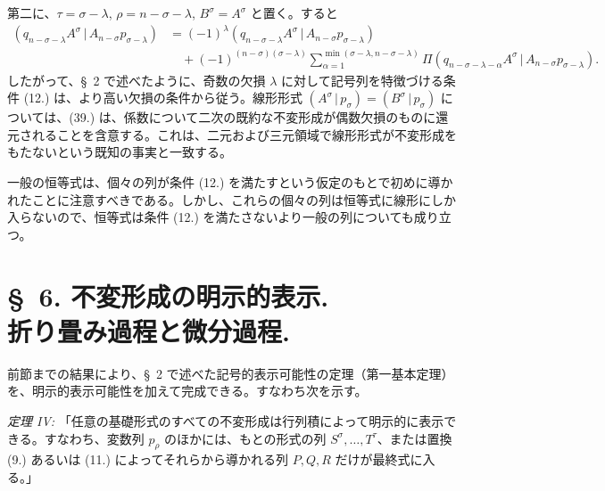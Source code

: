 \documentclass[11pt]{jlreq}
\newcommand{\pair}[2]{(#1\,|\,#2)}
\begin{document}
第二に、$\tau=\sigma-\lambda$, $\rho=n-\sigma-\lambda$, $B^\sigma=A^\sigma$ と置く。すると
\begin{equation}
\begin{aligned}
\pair{q_{n-\sigma-\lambda}A^\sigma}{A_{n-\sigma}p_{\sigma-\lambda}}
&=(-1)^\lambda\pair{q_{n-\sigma-\lambda}A^\sigma}{A_{n-\sigma}p_{\sigma-\lambda}}\\
&\quad+(-1)^{(n-\sigma)(\sigma-\lambda)}
 \sum_{\alpha=1}^{\min(\sigma-\lambda,n-\sigma-\lambda)}
 \Pi\pair{q_{n-\sigma-\lambda-\alpha}A^\sigma}{A_{n-\sigma}p_{\sigma-\lambda}}.
\end{aligned}
\tag{39}
\end{equation}
したがって、\S\ 2 で述べたように、奇数の欠損 $\lambda$ に対して記号列を特徴づける条件 (12.) は、より高い欠損の条件から従う。線形形式 $\pair{A^\sigma}{p_\sigma}=\pair{B^\sigma}{p_\sigma}$ については、(39.) は、係数について二次の既約な不変形成が偶数欠損のものに還元されることを含意する。これは、二元および三元領域で線形形式が不変形成をもたないという既知の事実と一致する。

一般の恒等式は、個々の列が条件 (12.) を満たすという仮定のもとで初めに導かれたことに注意すべきである。しかし、これらの個々の列は恒等式に線形にしか入らないので、恒等式は条件 (12.) を満たさないより一般の列についても成り立つ。

\section*{\S\ 6. 不変形成の明示的表示.\\折り畳み過程と微分過程.}
前節までの結果により、\S\ 2 で述べた記号的表示可能性の定理（第一基本定理）を、明示的表示可能性を加えて完成できる。すなわち次を示す。

\emph{定理 IV:} 「任意の基礎形式のすべての不変形成は行列積によって明示的に表示できる。すなわち、変数列 $p_\rho$ のほかには、もとの形式の列 $S^\sigma,\ldots,T^\tau$、または置換 (9.) あるいは (11.) によってそれらから導かれる列 $P,Q,R$ だけが最終式に入る。」
\end{document}
